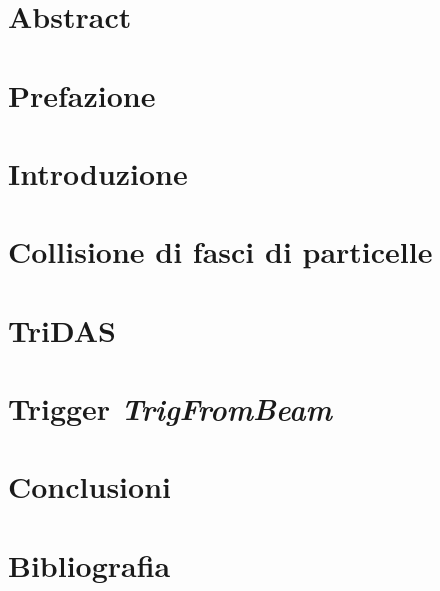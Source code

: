 \documentclass[12pt, a4paper, twoside]{report}
\begin{document}
\begin{titlepage}
    
\end{titlepage}
\setcounter{page}{1}
\chapter*{Abstract}

\chapter*{Prefazione}

\tableofcontents{}
\newpage
\chapter*{Introduzione}

\chapter{Collisione di fasci di particelle}

\chapter{TriDAS}

\chapter{Trigger \emph{TrigFromBeam}}

\chapter{Conclusioni}

\chapter{Bibliografia}

\end{document}
